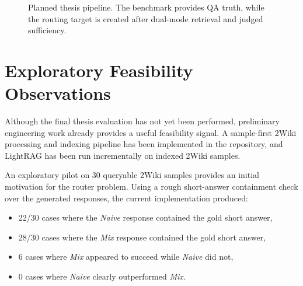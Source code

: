 \documentclass[11pt, a4paper]{article}
\begin{document}
\begin{figure}[ht]
\centering
{}
\caption{Planned thesis pipeline. The benchmark provides QA truth, while the routing target is created after dual-mode retrieval and judged sufficiency.}
\end{figure}

\section{Exploratory Feasibility Observations}

Although the final thesis evaluation has not yet been performed, preliminary engineering work already provides a useful feasibility signal. A sample-first 2Wiki processing and indexing pipeline has been implemented in the repository, and LightRAG has been run incrementally on indexed 2Wiki samples.

An exploratory pilot on 30 queryable 2Wiki samples provides an initial motivation for the router problem. Using a rough short-answer containment check over the generated responses, the current implementation produced:
\begin{itemize}[label=--]
    \item 22/30 cases where the \emph{Naive} response contained the gold short answer,
    \item 28/30 cases where the \emph{Mix} response contained the gold short answer,
    \item 6 cases where \emph{Mix} appeared to succeed while \emph{Naive} did not,
    \item 0 cases where \emph{Naive} clearly outperformed \emph{Mix}.
\end{itemize}
\end{document}

